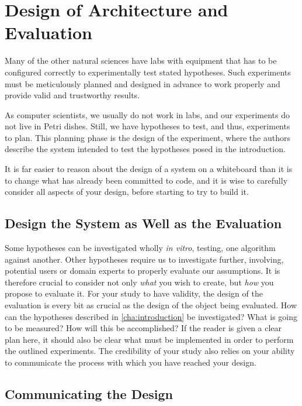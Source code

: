 \chapter{Design of Architecture and Evaluation}
\label{cha:design-and-method}

Many of the other natural sciences have labs with equipment that has to be
configured correctly to experimentally test stated hypotheses.  Such
experiments must be meticulously planned and designed in advance to work
properly and provide valid and trustworthy results.

As computer scientists, we usually do not work in labs, and our experiments
do not live in Petri dishes. Still, we have hypotheses to test, and thus,
experiments to plan. This planning phase is the design of the experiment,
where the authors describe the system intended to test the hypotheses posed
in the introduction.

It is far easier to reason about the design of a system on a whiteboard than
it is to change what has already been committed to code, and it is wise to
carefully consider all aspects of your design, before starting to try to
build it.


\section{Design the System as Well as the Evaluation}
\label{sec:design-system-as}

Some hypotheses can be investigated wholly \emph{in vitro}, testing, \eg one
algorithm against another. Other hypotheses require us to investigate
further, involving, \eg potential users or domain experts to properly
evaluate our assumptions. It is therefore crucial to consider not only
\emph{what} you wish to create, but \emph{how} you propose to evaluate
it. For your study to have validity, the design of the evaluation is every
bit as crucial as the design of the object being evaluated.  How can the
hypotheses described in \autoref{cha:introduction} be investigated?  What is
going to be measured? How will this be accomplished? If the reader is given
a clear plan here, it should also be clear what must be implemented in order
to perform the outlined experiments.  The credibility of your study also
relies on your ability to communicate the process with which you have
reached your design.

\section{Communicating the Design}
\label{sec:communicating-design}

